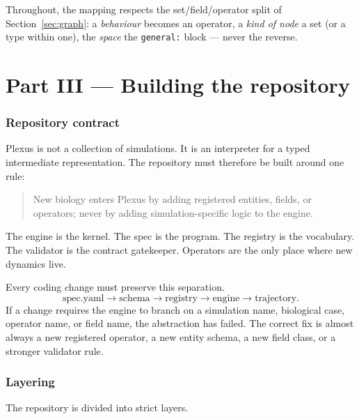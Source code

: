 \documentclass[11pt]{article}
\newcommand{\code}[1]{\texttt{#1}}
\begin{document}
Throughout, the mapping respects the set/field/operator split of
Section~\ref{sec:graph}: a \emph{behaviour} becomes an operator, a \emph{kind of
node} a set (or a type within one), the \emph{space} the \code{general:} block ---
never the reverse.

\part*{Part III --- Building the repository}

\section{Repository contract}

Plexus is not a collection of simulations. It is an interpreter for a typed
intermediate representation. The repository must therefore be built around one rule:

\begin{quote}
New biology enters Plexus by adding registered entities, fields, or operators;
never by adding simulation-specific logic to the engine.
\end{quote}

The engine is the kernel. The spec is the program. The registry is the vocabulary.
The validator is the contract gatekeeper. Operators are the only place where new
dynamics live.

Every coding change must preserve this separation.
\[
\text{spec.yaml}
\longrightarrow \text{schema}
\longrightarrow \text{registry}
\longrightarrow \text{engine}
\longrightarrow \text{trajectory}.
\]
If a change requires the engine to branch on a simulation name, biological case,
operator name, or field name, the abstraction has failed. The correct fix is almost
always a new registered operator, a new entity schema, a new field class, or a
stronger validator rule.

\section{Layering}

The repository is divided into strict layers.
\end{document}
